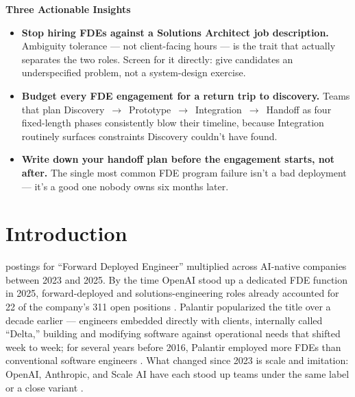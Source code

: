\documentclass[journal]{IEEEtran}
\begin{document}
\vspace{4pt}
\begin{mdframed}[
  linecolor=midgreen, linewidth=1.6pt,
  backgroundcolor=midgreen!6,
  innerleftmargin=10pt, innerrightmargin=10pt,
  innertopmargin=8pt, innerbottommargin=8pt,
  roundcorner=5pt
]
\noindent\textbf{\textcolor{midgreen}{Three Actionable Insights}}
\begin{itemize}
  \item \textbf{Stop hiring FDEs against a Solutions Architect job description.} Ambiguity tolerance --- not client-facing hours --- is the trait that actually separates the two roles. Screen for it directly: give candidates an underspecified problem, not a system-design exercise.
  \item \textbf{Budget every FDE engagement for a return trip to discovery.} Teams that plan Discovery~$\to$~Prototype~$\to$~Integration~$\to$~Handoff as four fixed-length phases consistently blow their timeline, because Integration routinely surfaces constraints Discovery couldn't have found.
  \item \textbf{Write down your handoff plan before the engagement starts, not after.} The single most common FDE program failure isn't a bad deployment --- it's a good one nobody owns six months later.
\end{itemize}
\end{mdframed}
\vspace{4pt}

\section{Introduction}
\label{sec:intro}

 postings for ``Forward Deployed Engineer'' multiplied across AI-native companies between 2023 and 2025. By the time OpenAI stood up a dedicated FDE function in 2025, forward-deployed and solutions-engineering roles already accounted for 22 of the company's 311 open positions \cite{schmidt2025servicesledgrowth}. Palantir popularized the title over a decade earlier --- engineers embedded directly with clients, internally called ``Delta,'' building and modifying software against operational needs that shifted week to week; for several years before 2016, Palantir employed more FDEs than conventional software engineers \cite{orosz2025fde}. What changed since 2023 is scale and imitation: OpenAI, Anthropic, and Scale AI have each stood up teams under the same label or a close variant \cite{openai2026fdelifesciences,anthropic2026fde,scaleai2026fde}.
\end{document}
